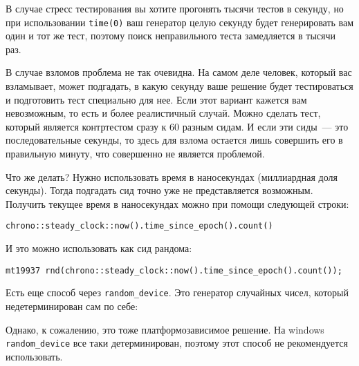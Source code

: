 В случае стресс тестирования вы хотите прогонять тысячи тестов в секунду, но при использовании \verb+time(0)+ ваш генератор целую секунду будет генерировать вам один и тот же тест, поэтому поиск неправильного теста замедляется в тысячи раз.

В случае взломов проблема не так очевидна. На самом деле человек, который вас взламывает, может подгадать, в какую секунду ваше решение будет тестироваться и подготовить тест специально для нее. Если этот вариант кажется вам невозможным, то есть и более реалистичный случай. Можно сделать тест, который является контртестом сразу к $60$ разным сидам. И если эти сиды~--- это последовательные секунды, то здесь для взлома остается лишь совершить его в правильную минуту, что совершенно не является проблемой.

Что же делать? Нужно использовать время в наносекундах (миллиардная доля секунды). Тогда подгадать сид точно уже не представляется возможным. Получить текущее время в наносекундах можно при помощи следующей строки:

\verb+chrono::steady_clock::now().time_since_epoch().count()+

И это можно использовать как сид рандома:

\verb+mt19937 rnd(chrono::steady_clock::now().time_since_epoch().count());+

Есть еще способ через \verb+random_device+. Это генератор случайных чисел, который недетерминирован сам по себе:



Однако, к сожалению, это тоже платформозависимое решение. На windows \verb+random_device+ все таки детерминирован, поэтому этот способ не рекомендуется использовать.
